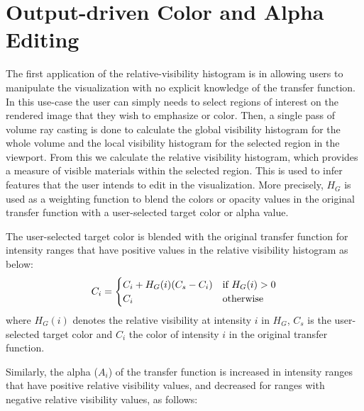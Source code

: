 \documentclass[twoside,twocolumn,10pt]{article}
\begin{document}
\section{Output-driven Color and Alpha Editing} \label{color_and_alpha_editing}

The first application of the relative-visibility histogram is in allowing users to manipulate the visualization with no explicit knowledge of the transfer function. In this use-case the user can simply needs to select regions of interest on the rendered image that they wish to emphasize or color.
Then, a single pass of volume ray casting is done to calculate the global visibility histogram for the whole volume and the local visibility histogram for the selected region in the viewport. From this we calculate the relative visibility histogram, which provides a measure of visible materials within the selected region. This is used to infer features that the user intends to edit in the visualization. More precisely, $H_G$ is used as a weighting function to blend the colors or opacity values in the original transfer function with a user-selected target color or alpha value.

The user-selected target color is blended with the original transfer function for intensity ranges that have positive values in the relative visibility histogram as below:
\[
C_{i} =
\begin{cases}
C_{i}+H_{G}(i)(C_{s}-C_{i}) & \text{if $ H_{G}(i)>0 $} \\
C_{i} & \text{otherwise}
\end{cases}
\]
where $ H_{G}(i) $ denotes the relative visibility at intensity $ i $ in $ H_{G} $, $ C_{s} $ is the user-selected target color and $ C_{i} $ the color of intensity $ i $ in the original transfer function.

Similarly, the alpha ($A_i$) of the transfer function is increased in intensity ranges that have positive relative visibility values, and decreased for ranges with negative relative visibility values, as follows:



\end{document}
